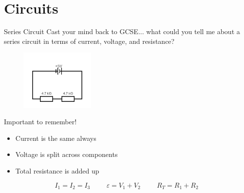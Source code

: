 \documentclass[../Main.tex]{subfiles}
\begin{document}
\author{Circuits} %
\date{Year 1 Topic 14} %

\section{Circuits} %

\begin{frame}{Series Circuit}
    Cast your mind back to GCSE... what could you tell me about a series circuit in terms of current, voltage, and resistance?
    \begin{figure}
        \centering
        \includegraphics[height=3cm]{Electricity_Images/series_circuit.png}
    \end{figure} \pause

      \begin{block}{Important to remember!}
    \begin{itemize}
        \item Current is the same always
        \item Voltage is split across components
        \item Total resistance is added up
    \end{itemize}
    \begin{equation*}
        I_1=I_2=I_3 \hspace{1cm} \varepsilon = V_1 + V_2 \hspace{1cm}  R_T=R_1+R_2
    \end{equation*}
    \end{block}
\end{frame}
\end{document}
